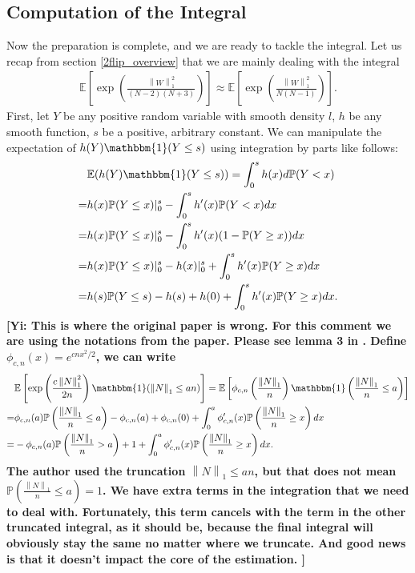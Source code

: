 \documentclass[10pt]{article}
\newcommand{\e}{\mathbb{E}}
\newcommand{\p}{\mathbb{P}}
\newcommand{\norm}[1]{\left\lVert#1\right\rVert}
\newcommand{\gy}[1]{\textbf{\color{red}[Yi: #1]}}
\newenvironment{Proof of lemma}{\noindent{\bf Proof of Lemma}}{\hfill$\Box$\newline}
\newenvironment{Proof of claim}{\noindent{\bf Proof of claim}}{\hfill$\Box$\newline}
\newenvironment{Proof of theorem}{\noindent{\bf Proof of Theorem}}{\hfill\scriptsize{$\Box$}\newline}
\newenvironment{Proof of theorems}{\noindent{\bf Proof of Theorems}}{\hfill$\Box$\newline}
\newenvironment{Proof of proposition}{\noindent{\bf Proof of Proposition}}{\hfill$\Box$\newline}
\newenvironment{Proof of propositions}{\noindent{\bf Proof of Propositions}}{\hfill$\Box$\newline}
\newenvironment{Proof of exercise}{\noindent{\it Proof of Exercise:}}{\hfill$\Box$}
\numberwithin{equation}{section}
\begin{document}
\subsection{Computation of the Integral}
Now the preparation is complete, and we are ready to tackle the integral. Let us recap from section \ref{2flip_overview} that we are mainly dealing with the integral
\begin{align}
    \e \left[ \exp \left(\frac{\norm{W}^2_1}{(N-2)(N+3)}\right)\right] \approx \e \left[ \exp \left(\frac{\norm{W}^2_1}{N(N-1)}\right) \right].
\end{align}
First, let $Y$ be any positive random variable with smooth density $l$, $h$ be any smooth function, $s$ be a positive, arbitrary constant. We can manipulate the expectation of $h(Y)\mathbbm{1}(Y \leq s)$ using integration by parts like follows:
\begin{align} \label{ibp_formula}
    &\e(h(Y)\mathbbm{1}(Y \leq s)) = \int_{0}^{s} h(x)d\p(Y < x) \nonumber \\
    =& h(x)\p(Y\leq x)|_{0}^{s} - \int_{0}^{s} h'(x)\p(Y < x)dx \nonumber \\
    =&  h(x)\p(Y\leq x)|_{0}^{s}- \int_{0}^{s} h'(x)(1- \p(Y\geq x))dx \nonumber \\
    =& h(x)\p(Y\leq x)|_{0}^{s} - h(x)|_{0}^{s} + \int_{0}^{s} h'(x)\p(Y\geq x)dx \nonumber \\
    =& h(s) \p(Y\leq s) -h(s) +h(0) + \int_{0}^{s} h'(x)\p(Y\geq x)dx.
\end{align}
\gy{
    This is where the original paper is wrong. For this comment we are using the notations from the paper. Please see lemma 3 in \cite{SK_optimal}. Define $\phi_{c,n}(x) = e^{cnx^2/2}$, we can write
    \begin{align} \label{ibp_integral}
        &\e \left[ \exp \left(\frac{c\norm{N}^2_1}{2n}\right) \mathbbm{1}(\norm{N}_1 \leq an) \right] = \e \left[ \phi_{c,n} \left(\frac{\norm{N}_1}{n}\right) \mathbbm{1}\left(\frac{\norm{N}_1}{n} \leq a \right) \right] \nonumber \\
        =&\phi_{c,n}(a)\p\left(\frac{\norm{N}_1}{n} \leq a\right) - \phi_{c,n}(a) + \phi_{c,n}(0) + \int_{0}^{a} \phi'_{c,n}(x) \p\left(\frac{\norm{N}_1}{n} \geq x\right) dx \nonumber  \\
        =&-\phi_{c,n}(a) \p\left(\frac{\norm{N}_1}{n} > a\right) + 1 + \int_{0}^{a} \phi'_{c,n}(x) \p\left(\frac{\norm{N}_1}{n} \geq x\right) dx.
    \end{align}
    The author used the truncation $\norm{N}_1 \leq an$, but that does not mean $\p\left(\frac{\norm{N}_1}{n} \leq a\right) = 1$. We have extra terms in the integration that we need to deal with. Fortunately, this term cancels with the term in the other truncated integral, as it should be, because the final integral will obviously stay the same no matter where we truncate. And good news is that it doesn't impact the core of the estimation.
}
\end{document}
